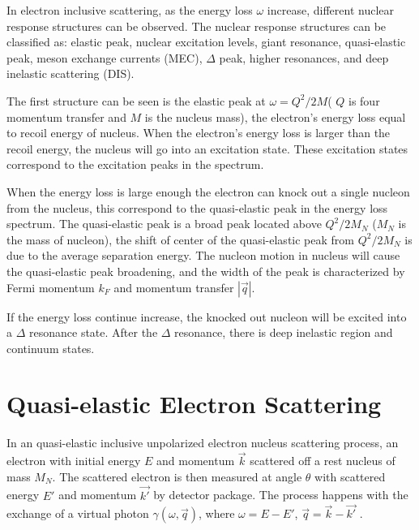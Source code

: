 In electron inclusive scattering, as the energy loss $\omega$ increase, different nuclear response structures can
be observed.
The nuclear response structures can be classified as: elastic peak, nuclear excitation levels, giant resonance,
quasi-elastic peak, meson exchange currents (MEC), $\Delta$ peak, higher resonances, and deep inelastic scattering
(DIS).

The first structure can be seen is the elastic peak at $\omega = Q^2/2M$( $Q$ is four momentum transfer and $M$ is the
nucleus mass), the electron's energy loss equal to recoil energy of nucleus.
When the electron's energy loss is larger than the recoil energy, the nucleus will go into an excitation state.
These excitation states correspond to the excitation peaks in the spectrum.

When the energy loss is large enough the electron can knock out a single nucleon from the nucleus, this correspond to
the quasi-elastic peak in the energy loss spectrum. The quasi-elastic peak is a broad peak located above $Q^2/2M_N$ ($M_N$
is the mass of nucleon), the shift of center of the quasi-elastic peak from $Q^2/2M_N$ is due to the average
separation energy. The nucleon motion in nucleus will cause the quasi-elastic peak broadening, and the width of the peak
is characterized by Fermi momentum $k_F$ and momentum transfer $|\vec{q}|$.

If the energy loss continue increase, the knocked out nucleon will be excited into a $\Delta$ resonance state. 
After the $\Delta$ resonance, there is deep inelastic region and continuum states.


\section{Quasi-elastic Electron Scattering}

In an quasi-elastic inclusive unpolarized electron nucleus scattering process, an electron with initial energy $E$ and
momentum $\vec{k}$ scattered off a rest nucleus of mass $M_N$.
The scattered electron is then measured at angle $\theta$ with scattered energy $E'$ and momentum $\vec{k'}$ by detector package.
The process happens with the exchange of a virtual photon $\gamma (\omega, \vec{q})$,
where $\omega = E - E'$, $\vec{q} = \vec{k} - \vec{k'}$ .

